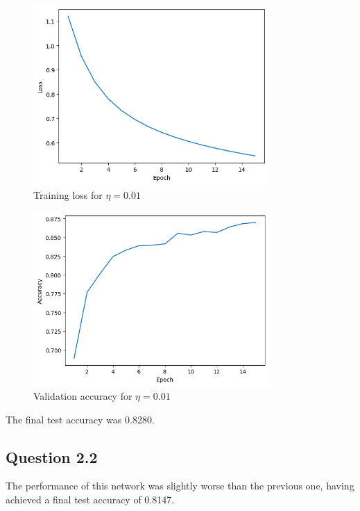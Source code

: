 \documentclass{article}
\begin{document}
\begin{figure}[H]
    \centering
    \includegraphics[width=0.8\textwidth]{plots/CNN-training-loss-0.01-0.7-0-sgd-False.png}
    \caption{Training loss for $\eta=0.01$}
    \label{fig:2.1-training_loss}
\end{figure}

\begin{figure}[H]
    \centering
    \includegraphics[width=0.8\textwidth]{plots/CNN-validation-accuracy-0.01-0.7-0-sgd-False.png}
    \caption{Validation accuracy for $\eta=0.01$}
    \label{fig:2.1-validation_accuracy}
\end{figure}

The final test accuracy was 0.8280.

\subsection{Question 2.2}
The performance of this network was slightly worse than the previous one, 
having achieved a final test accuracy of 0.8147.
\end{document}
